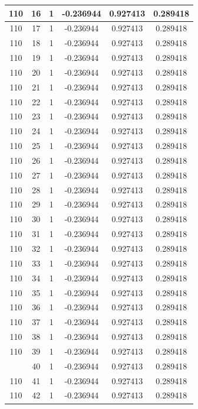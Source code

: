 \documentclass[12pt,a4paper]{article}
\numberwithin{equation}{section}
\numberwithin{figure}{section}
\numberwithin{table}{section}
\begin{document}
\begin{longtable}{|c|c|c|c|c|c|}
110 & 16 & 1 & -0.236944 & 0.927413 & 0.289418 \\ \hline
110 & 17 & 1 & -0.236944 & 0.927413 & 0.289418 \\ \hline
110 & 18 & 1 & -0.236944 & 0.927413 & 0.289418 \\ \hline
110 & 19 & 1 & -0.236944 & 0.927413 & 0.289418 \\ \hline
110 & 20 & 1 & -0.236944 & 0.927413 & 0.289418 \\ \hline
110 & 21 & 1 & -0.236944 & 0.927413 & 0.289418 \\ \hline
110 & 22 & 1 & -0.236944 & 0.927413 & 0.289418 \\ \hline
110 & 23 & 1 & -0.236944 & 0.927413 & 0.289418 \\ \hline
110 & 24 & 1 & -0.236944 & 0.927413 & 0.289418 \\ \hline
110 & 25 & 1 & -0.236944 & 0.927413 & 0.289418 \\ \hline
110 & 26 & 1 & -0.236944 & 0.927413 & 0.289418 \\ \hline
110 & 27 & 1 & -0.236944 & 0.927413 & 0.289418 \\ \hline
110 & 28 & 1 & -0.236944 & 0.927413 & 0.289418 \\ \hline
110 & 29 & 1 & -0.236944 & 0.927413 & 0.289418 \\ \hline
110 & 30 & 1 & -0.236944 & 0.927413 & 0.289418 \\ \hline
110 & 31 & 1 & -0.236944 & 0.927413 & 0.289418 \\ \hline
110 & 32 & 1 & -0.236944 & 0.927413 & 0.289418 \\ \hline
110 & 33 & 1 & -0.236944 & 0.927413 & 0.289418 \\ \hline
110 & 34 & 1 & -0.236944 & 0.927413 & 0.289418 \\ \hline
110 & 35 & 1 & -0.236944 & 0.927413 & 0.289418 \\ \hline
110 & 36 & 1 & -0.236944 & 0.927413 & 0.289418 \\ \hline
110 & 37 & 1 & -0.236944 & 0.927413 & 0.289418 \\ \hline
110 & 38 & 1 & -0.236944 & 0.927413 & 0.289418 \\ \hline
110 & 39 & 1 & -0.236944 & 0.927413 & 0.289418 \\ \hline
\pagebreak
110 & 40 & 1 & -0.236944 & 0.927413 & 0.289418 \\ \hline
110 & 41 & 1 & -0.236944 & 0.927413 & 0.289418 \\ \hline
110 & 42 & 1 & -0.236944 & 0.927413 & 0.289418 \\ \hline

\end{longtable}
\end{document}
